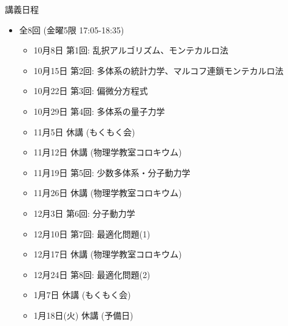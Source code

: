 \begin{frame}[t]{講義日程}
  \begin{itemize}
  \item 全8回 (金曜5限 {\color{red}17:05}-18:35)
    \begin{itemize}
    \item {\color{gray} 10月8日 第1回: 乱択アルゴリズム、モンテカルロ法}
    \item {\color{gray} 10月15日 第2回: 多体系の統計力学、マルコフ連鎖モンテカルロ法}
    \item {\color{gray} 10月22日 第3回: 偏微分方程式}
    \item {\color{gray} 10月29日 第4回: 多体系の量子力学}
    \item {\color{gray} 11月5日 休講 (もくもく会)}
    \item {\color{gray} 11月12日 休講 (物理学教室コロキウム)}
    \item {\color{gray} 11月19日 第5回: 少数多体系・分子動力学}
    \item {\color{gray} 11月26日 休講 (物理学教室コロキウム)}
    \item {\color{gray} 12月3日 第6回: 分子動力学}
    \item {\color{gray} 12月10日 第7回: 最適化問題(1)}
    \item {\color{gray} 12月17日 休講 (物理学教室コロキウム)}
    \item 12月24日 第8回: 最適化問題(2)
    \item 1月7日 休講 (もくもく会)
    \item {\color{gray} 1月18日(火) 休講 (予備日)}
    \end{itemize}
  \end{itemize}
\end{frame}
